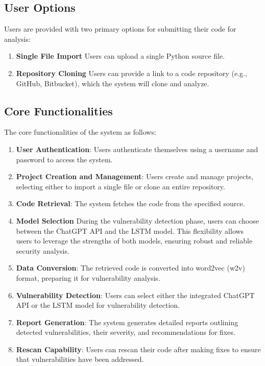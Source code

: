 \subsection{User Options}
Users are provided with two primary options for submitting their code for analysis:
\begin{enumerate}
\item{\textbf{Single File Import}} Users can upload a single Python source file.
\item{\textbf{Repository Cloning}} Users can provide a link to a code repository (e.g., GitHub, Bitbucket), which the system will clone and analyze.
\end{enumerate}
\subsection{Core Functionalities}
The core functionalities of the system as follows:

\begin{enumerate}

\item{\textbf{User Authentication}}: Users authenticate themselves using a username and password to access the system.
\item{\textbf{Project Creation and Management}}: Users create and manage projects, selecting either to import a single file or clone an entire repository.
\item{\textbf{Code Retrieval}}: The system fetches the code from the specified source.
\item{\textbf{Model Selection}} During the vulnerability detection phase, users can choose between the ChatGPT API and the LSTM model. 
This flexibility allows users to leverage the strengths of both models, ensuring robust and reliable security analysis.
\item{\textbf{Data Conversion}}: The retrieved code is converted into word2vec (w2v) format, preparing it for vulnerability analysis.
\item{\textbf{Vulnerability Detection}}: Users can select either the integrated ChatGPT API or the LSTM model for vulnerability detection.
\item{\textbf{Report Generation}}: The system generates detailed reports outlining detected vulnerabilities, their severity, and recommendations for fixes.
\item{\textbf{Rescan Capability}}: Users can rescan their code after making fixes to ensure that vulnerabilities have been addressed.

\end{enumerate}

